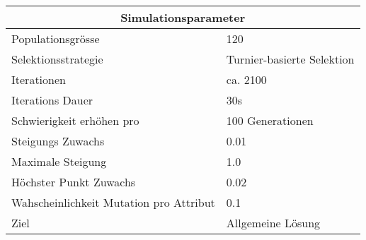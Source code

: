 
    \begin{tabular}{ | l | l | }
      \hline
      \multicolumn{2}{|c|}{Simulationsparameter} \\
      \hline
      Populationsgrösse & 120 \\ \hline
      Selektionsstrategie & Turnier-basierte Selektion \\ \hline
      Iterationen & ca. 2100 \\ \hline
      Iterations Dauer & 30s \\ \hline
      Schwierigkeit erhöhen pro & 100 Generationen \\ \hline
      Steigungs Zuwachs & 0.01 \\ \hline
      Maximale Steigung & 1.0 \\ \hline
      Höchster Punkt Zuwachs & 0.02 \\ \hline
      Wahscheinlichkeit Mutation pro Attribut & 0.1 \\ \hline
      Ziel & Allgemeine Lösung \\ \hline
    \end{tabular}
